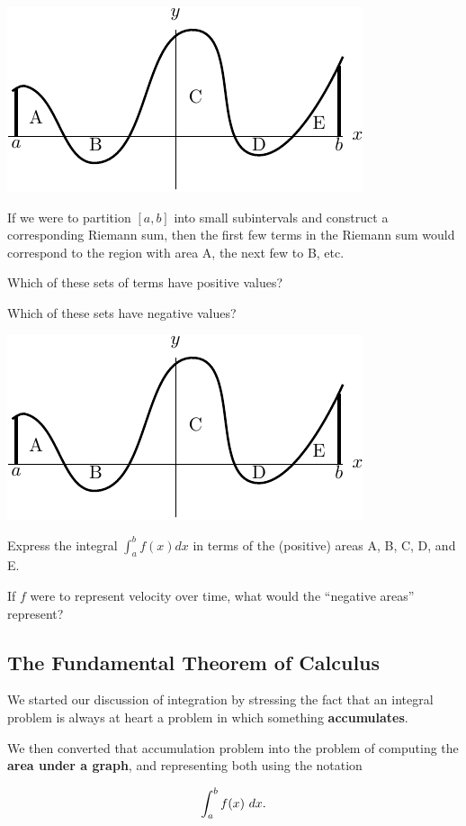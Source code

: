 \newpage
\begin{center}
\includegraphics[width=0.4\linewidth]{graphics/notes_04_negative_area_example}
\end{center}

If we were to partition $[a,b]$ into small subintervals and construct a corresponding Riemann sum, then the first few terms in the Riemann sum would correspond to the region with area A, the next few to B, etc. 

\problem 
Which of these sets of terms have positive values?

\vfill

Which of these sets have negative values?
\vfill

\newpage

\begin{center}
\includegraphics[width=0.3\linewidth]{graphics/notes_04_negative_area_example}
\end{center}
\problem 
{Express the integral $\displaystyle \int_a^b f(x) dx$ in
  terms of the (positive) areas A, B, C, D, and E.  }

\vfill
\vfill

{If $f$ were to represent velocity over time, what would the ``negative
  areas'' represent?}

\vfill
\newpage

\subsection*{The Fundamental Theorem of Calculus}
We started our discussion of integration by stressing
the fact that an integral problem is always at heart a problem in
which something {\bf accumulates}. 

We then converted that accumulation problem into the problem of
computing the {\bf area under a graph}, and representing 
both using the notation

$$\displaystyle \int_a^b f(x)~dx.$$

